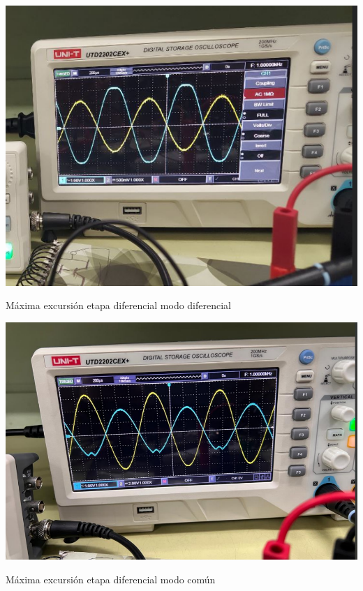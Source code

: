 \begin{ilustracion}[ht]
    \centering
    \includegraphics[width=1.0\textwidth]{src/images/resultados/p2/med-maxima-excursion-mod-diff.png}
    \caption{Máxima excursión etapa diferencial modo diferencial}
    \label{ilus:max-excursion-mod-diff}
\end{ilustracion}

\begin{ilustracion}[ht]
    \centering
    \includegraphics[width=1.0\textwidth]{src/images/resultados/p2/med-maxima-excursion-mod-comun.png}
    \caption{Máxima excursión etapa diferencial modo común}
    \label{ilus:max-excursion-mod-comun}
\end{ilustracion}
